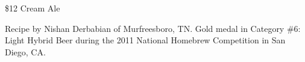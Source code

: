 \documentclass[parskip=half,fontsize=9pt,oneside]{scrbook}
\begin{document}
\mainmatter


\begin{recipe}{\$12 Cream Ale}

\begin{aboutblock}
Recipe by Nishan Derbabian of Murfreesboro, TN. Gold medal in Category \#6: Light
Hybrid Beer during the 2011 National Homebrew Competition in San Diego, CA.
\sourceaha
\end{aboutblock}


\begin{methodandtiming}

\begin{mashsteps}
\end{mashsteps}

\begin{fermentationsteps}
\end{fermentationsteps}

\end{methodandtiming}

\recipebreak

\begin{ingredientsblock}

\begin{malts}
\end{malts}

\begin{hops}
\end{hops}


\end{ingredientsblock}

\end{recipe}


\end{document}
